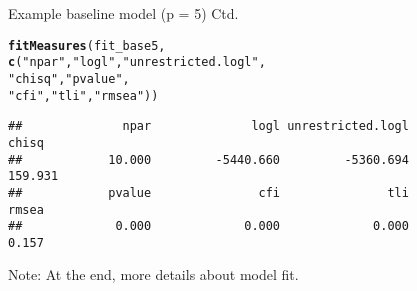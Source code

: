 \documentclass[10pt]{beamer}\usepackage[]{graphicx}\usepackage[]{xcolor}
\makeatletter
\newcommand{\hlsng}[1]{\textcolor[rgb]{0.192,0.494,0.8}{#1}}%
\newcommand{\hldef}[1]{\textcolor[rgb]{0.345,0.345,0.345}{#1}}%
\newcommand{\hlkwd}[1]{\textcolor[rgb]{0.737,0.353,0.396}{\textbf{#1}}}%
\newenvironment{kframe}{%
 \def\at@end@of@kframe{}%
 \ifinner\ifhmode%
  \def\at@end@of@kframe{\end{minipage}}%
  \begin{minipage}{\columnwidth}%
 \fi\fi%
 \def\FrameCommand##1{\hskip\@totalleftmargin \hskip-\fboxsep
 \colorbox{shadecolor}{##1}\hskip-\fboxsep
     \hskip-\linewidth \hskip-\@totalleftmargin \hskip\columnwidth}%
 \MakeFramed {\advance\hsize-\width
   \@totalleftmargin\z@ \linewidth\hsize
   \@setminipage}}%
 {\par\unskip\endMakeFramed%
 \at@end@of@kframe}
\newenvironment{knitrout}{}{} %
\makeatother
\begin{document}
\begin{frame}[fragile]{Example baseline  model (p = 5) Ctd.}

\begin{knitrout}
\color{fgcolor}\begin{kframe}
\begin{alltt}
\hlkwd{fitMeasures}\hldef{(fit_base5,}
            \hlkwd{c}\hldef{(}\hlsng{"npar"}\hldef{,} \hlsng{"logl"}\hldef{,} \hlsng{"unrestricted.logl"}\hldef{,}
              \hlsng{"chisq"}\hldef{,} \hlsng{"pvalue"}\hldef{,}
              \hlsng{"cfi"}\hldef{,} \hlsng{"tli"}\hldef{,} \hlsng{"rmsea"}\hldef{))}
\end{alltt}
\begin{verbatim}
##              npar              logl unrestricted.logl             chisq 
##            10.000         -5440.660         -5360.694           159.931 
##            pvalue               cfi               tli             rmsea 
##             0.000             0.000             0.000             0.157
\end{verbatim}
\end{kframe}
\end{knitrout}

\vspace{5mm}

Note: At the end, more details about model fit.

\end{frame}
%
\end{document}
